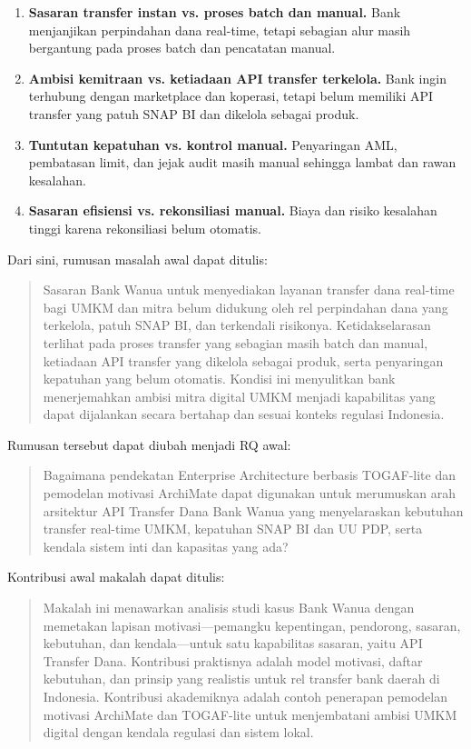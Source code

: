 \begin{enumerate}
  \item \textbf{Sasaran transfer instan vs. proses batch dan manual.} Bank
        menjanjikan perpindahan dana real-time, tetapi sebagian alur masih
        bergantung pada proses batch dan pencatatan manual.
  \item \textbf{Ambisi kemitraan vs. ketiadaan API transfer terkelola.} Bank
        ingin terhubung dengan marketplace dan koperasi, tetapi belum memiliki
        API transfer yang patuh SNAP BI dan dikelola sebagai produk.
  \item \textbf{Tuntutan kepatuhan vs. kontrol manual.} Penyaringan AML,
        pembatasan limit, dan jejak audit masih manual sehingga lambat dan
        rawan kesalahan.
  \item \textbf{Sasaran efisiensi vs. rekonsiliasi manual.} Biaya dan risiko
        kesalahan tinggi karena rekonsiliasi belum otomatis.
\end{enumerate}

Dari sini, rumusan masalah awal dapat ditulis:

\begin{quote}
Sasaran Bank Wanua untuk menyediakan layanan transfer dana real-time bagi UMKM
dan mitra belum didukung oleh rel perpindahan dana yang terkelola, patuh SNAP
BI, dan terkendali risikonya. Ketidakselarasan terlihat pada proses transfer
yang sebagian masih batch dan manual, ketiadaan API transfer yang dikelola
sebagai produk, serta penyaringan kepatuhan yang belum otomatis. Kondisi ini
menyulitkan bank menerjemahkan ambisi mitra digital UMKM menjadi kapabilitas
yang dapat dijalankan secara bertahap dan sesuai konteks regulasi Indonesia.
\end{quote}

Rumusan tersebut dapat diubah menjadi RQ awal:

\begin{quote}
Bagaimana pendekatan Enterprise Architecture berbasis TOGAF-lite dan pemodelan
motivasi ArchiMate dapat digunakan untuk merumuskan arah arsitektur API
Transfer Dana Bank Wanua yang menyelaraskan kebutuhan transfer real-time UMKM,
kepatuhan SNAP BI dan UU PDP, serta kendala sistem inti dan kapasitas yang ada?
\end{quote}

Kontribusi awal makalah dapat ditulis:

\begin{quote}
Makalah ini menawarkan analisis studi kasus Bank Wanua dengan memetakan lapisan
motivasi---pemangku kepentingan, pendorong, sasaran, kebutuhan, dan
kendala---untuk satu kapabilitas sasaran, yaitu API Transfer Dana. Kontribusi
praktisnya adalah model motivasi, daftar kebutuhan, dan prinsip yang realistis
untuk rel transfer bank daerah di Indonesia. Kontribusi akademiknya adalah
contoh penerapan pemodelan motivasi ArchiMate dan TOGAF-lite untuk menjembatani
ambisi UMKM digital dengan kendala regulasi dan sistem lokal.
\end{quote}


